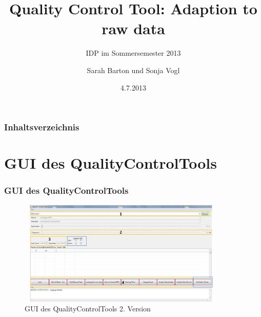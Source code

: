 \documentclass{beamer}
\title{\textbf{Quality Control Tool: Adaption to raw data}}
\subtitle{IDP im Sommersemester 2013}
\author{Sarah Barton und Sonja Vogl}
\date{4.7.2013}
\begin{document}
\begin{frame}
\titlepage
\end{frame} 

\begin{frame}
\frametitle{Inhaltsverzeichnis}
\tableofcontents
\end{frame} 


\section{GUI des QualityControlTools} 
\begin{frame}
\frametitle{GUI des QualityControlTools } 
\begin{figure}[H]
\centerline{
\includegraphics[width=100mm, height=50mm]{Abbildungen/ErweitertesTool1.JPG}
}
\caption {GUI des QualityControlTools 2. Version}
\end{figure}

\end{frame}
\end{document}
